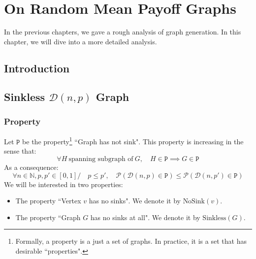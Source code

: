 \chapter{On Random Mean Payoff Graphs}
\label{appendix:RandomGraphs}
In the previous chapters, we gave a rough analysis of graph generation.
\newline In this chapter, we will dive into a more detailed analysis.

\section{Introduction}
\section{Sinkless $\mathcal{D}(n,p)$ Graph}

\subsection{Property}

Let $\mathtt{P}$ be the property\footnote{Formally, a property is a just a set of graphs. In practice, it is a set that has desirable ``properties".} ``Graph has not sink".
\newline This property is increasing in the sense that:
$$
\forall H \ \text{spanning subgraph of}\ G, \quad H \in \mathtt{P}\implies G\in\mathtt{P}
$$
As a consequence:
$$
\forall n\in\mathbb{N},p,p'\in[0,1] / \quad p\le p',\quad \mathscr{P}(\mathcal{D}(n,p)\in \mathtt{P}) \le \mathscr{P}(\mathcal{D}(n,p')\in \mathtt{P})
$$
We will be interested in two properties:
\begin{itemize}
	\item The property ``Vertex $v$ has no sinks". We denote it by $\text{NoSink}(v)$.
	\item The property ``Graph $G$ has no sinks at all". We denote it by $\text{Sinkless}(G)$.
\end{itemize}

